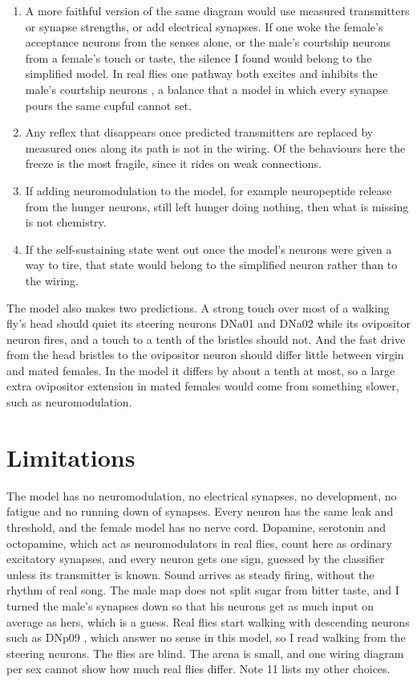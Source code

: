 \documentclass[11pt,a4paper]{article}
\begin{document}
\begin{enumerate}[leftmargin=*]
  \item A more faithful version of the same diagram would use measured transmitters or synapse strengths, or add electrical synapses. If one woke the female's acceptance neurons from the senses alone, or the male's courtship neurons from a female's touch or taste, the silence I found would belong to the simplified model. In real flies one pathway both excites and inhibits the male's courtship neurons \citep{clowney2015multimodal,kallman2015excitation}, a balance that a model in which every synapse pours the same cupful cannot set.
  \item Any reflex that disappears once predicted transmitters are replaced by measured ones along its path is not in the wiring. Of the behaviours here the freeze is the most fragile, since it rides on weak connections.
  \item If adding neuromodulation to the model, for example neuropeptide release from the hunger neurons, still left hunger doing nothing, then what is missing is not chemistry.
  \item If the self-sustaining state went out once the model's neurons were given a way to tire, that state would belong to the simplified neuron rather than to the wiring.
\end{enumerate}

The model also makes two predictions. A strong touch over most of a walking fly's head should quiet its steering neurons DNa01 and DNa02 while its ovipositor neuron fires, and a touch to a tenth of the bristles should not. And the fast drive from the head bristles to the ovipositor neuron should differ little between virgin and mated females. In the model it differs by about a tenth at most, so a large extra ovipositor extension in mated females would come from something slower, such as neuromodulation.

\section{Limitations}
\label{sec:limitations}

The model has no neuromodulation, no electrical synapses, no development, no fatigue and no running down of synapses. Every neuron has the same leak and threshold, and the female model has no nerve cord. Dopamine, serotonin and octopamine, which act as neuromodulators in real flies, count here as ordinary excitatory synapses, and every neuron gets one sign, guessed by the classifier unless its transmitter is known. Sound arrives as steady firing, without the rhythm of real song. The male map does not split sugar from bitter taste, and I turned the male's synapses down so that his neurons get as much input on average as hers, which is a guess. Real flies start walking with descending neurons such as DNp09 \citep{bidaye2020two}, which answer no sense in this model, so I read walking from the steering neurons. The flies are blind. The arena is small, and one wiring diagram per sex cannot show how much real flies differ. Note 11 lists my other choices.
\end{document}
